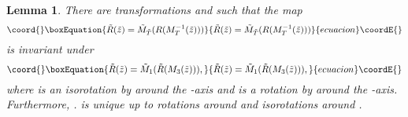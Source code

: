 \documentclass[a4paper,12pt]{article}
\newtheorem {lemma}[theorem]{Lemma}
\begin{document}
\begin{lemma}
\label{l:Rat}
There are transformations \coordHE{} and \coordHE{} such that the 
map 
%
\begin{equation}\coord{}\boxEquation{
{\tilde R} ({\tilde z}) = {\tilde M}_{\tilde T} (R 
(M_T^{-1} ({\tilde z})))
}{
{\tilde R} ({\tilde z}) = {\tilde M}_{\tilde T} (R 
(M_T^{-1} ({\tilde z})))
}{ecuacion}\coordE{}\end{equation}
%
is invariant under
\begin{equation}\coord{}\boxEquation{
\label{M1M3trafo}
{\tilde R}( {\tilde z}) = {\tilde M}_1 ({\tilde R} (M_3 ({\tilde z}))),
}{
{\tilde R}( {\tilde z}) = {\tilde M}_1 ({\tilde R} (M_3 ({\tilde z}))),
}{ecuacion}\coordE{}\end{equation}
%
where \coordHE{} is an isorotation by \myHighlight{$\beta$}\coordHE{} around the \coordHE{}-axis 
and \coordHE{} is a rotation by \myHighlight{$\alpha$}\coordHE{} around the \coordHE{}-axis. Furthermore, 
\coordHE{}. 
\coordHE{} is unique up to rotations around \coordHE{} 
and isorotations around \coordHE{}.
\end{lemma}
\end{document}

